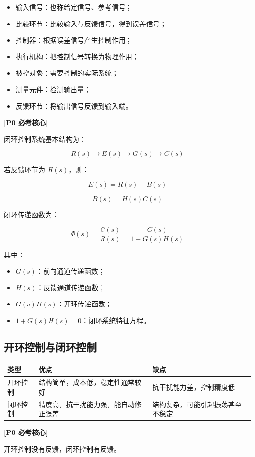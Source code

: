 \documentclass[UTF8,a4paper,12pt]{ctexart}
\newcommand{\Pzero}{\textcolor{p0}{\textbf{[P0 必考核心]}}}
\begin{document}
\begin{itemize}
    \item 输入信号：也称给定信号、参考信号；
    \item 比较环节：比较输入与反馈信号，得到误差信号；
    \item 控制器：根据误差信号产生控制作用；
    \item 执行机构：把控制信号转换为物理作用；
    \item 被控对象：需要控制的实际系统；
    \item 测量元件：检测输出量；
    \item 反馈环节：将输出信号反馈到输入端。
\end{itemize}

\Pzero

闭环控制系统基本结构为：

\[
R(s) \rightarrow E(s) \rightarrow G(s) \rightarrow C(s)
\]

若反馈环节为 $H(s)$，则：

\[
E(s)=R(s)-B(s)
\]

\[
B(s)=H(s)C(s)
\]

闭环传递函数为：

\[
\Phi(s)=\frac{C(s)}{R(s)}=\frac{G(s)}{1+G(s)H(s)}
\]

其中：
\begin{itemize}
    \item $G(s)$：前向通道传递函数；
    \item $H(s)$：反馈通道传递函数；
    \item $G(s)H(s)$：开环传递函数；
    \item $1+G(s)H(s)=0$：闭环系统特征方程。
\end{itemize}

\subsection{开环控制与闭环控制}

\begin{longtable}{p{3cm}p{5.5cm}p{5.5cm}}
\toprule
类型 & 优点 & 缺点 \\
\midrule
开环控制 & 结构简单，成本低，稳定性通常较好 & 抗干扰能力差，控制精度低 \\
闭环控制 & 精度高，抗干扰能力强，能自动修正误差 & 结构复杂，可能引起振荡甚至不稳定 \\
\bottomrule
\end{longtable}

\Pzero

开环控制没有反馈，闭环控制有反馈。
\end{document}
